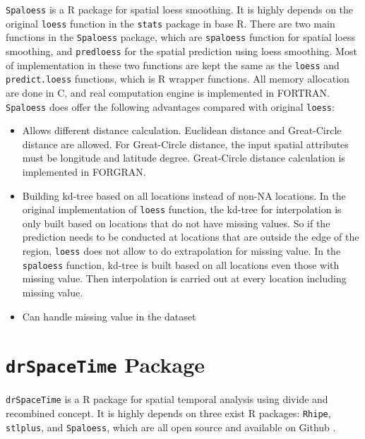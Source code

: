 \texttt{Spaloess} is a R package for spatial loess smoothing. It is highly 
depends on the original \texttt{loess} function in the \texttt{stats} package
in base R. There are two main functions in the \texttt{Spaloess} package, which 
are \texttt{spaloess} function for spatial loess smoothing, and \texttt{predloess} 
for the spatial prediction using loess smoothing. Most of implementation in these
two functions are kept the same as the \texttt{loess} and \texttt{predict.loess}
functions, which is R wrapper functions. All memory allocation are done in 
C, and real computation engine is implemented in FORTRAN. \texttt{Spaloess} does
offer the following advantages compared with original \texttt{loess}:

\begin{itemize}
\item Allows different distance calculation. Euclidean distance and Great-Circle
distance are allowed. For Great-Circle distance, the input spatial attributes
must be longitude and latitude degree. Great-Circle distance calculation is
implemented in FORGRAN.
\item Building kd-tree based on all locations instead of non-NA locations. 
In the original implementation of \texttt{loess} function, the kd-tree for
interpolation is only built based on locations that do not have missing values.
So if the prediction needs to be conducted at locations that are outside the 
edge of the region, \texttt{loess} does not allow to do extrapolation for missing
value. In the \texttt{spaloess} function, kd-tree is built based on all locations
even those with missing value. Then interpolation is carried out at every 
location including missing value.
\item Can handle missing value in the dataset
\end{itemize}

\section{\texttt{drSpaceTime} Package}

\texttt{drSpaceTime} is a R package for spatial temporal analysis using divide 
and recombined concept. It is highly depends on three exist R packages: 
\texttt{Rhipe}, \texttt{stlplus}, and \texttt{Spaloess}, which are all open 
source and available on Github \cite{github}.
